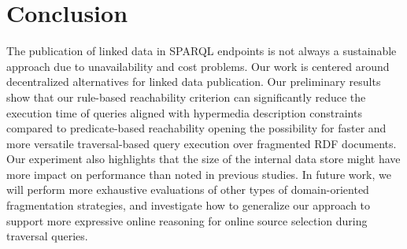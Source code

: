 \section{Conclusion}

The publication of linked data in SPARQL endpoints is not always a sustainable approach due to unavailability and cost problems.
Our work is centered around decentralized alternatives for linked data publication.
Our preliminary results show that our rule-based reachability criterion can significantly reduce the execution time of queries aligned with hypermedia description constraints compared to predicate-based reachability
opening the possibility for faster and more versatile traversal-based query execution over fragmented RDF documents.
Our experiment also highlights that the size of the internal data store might have more impact on performance than noted in previous studies.
In future work, we will perform more exhaustive evaluations of other types of domain-oriented fragmentation strategies,
and investigate how to generalize our approach to support more expressive online reasoning for online source selection during traversal queries.
